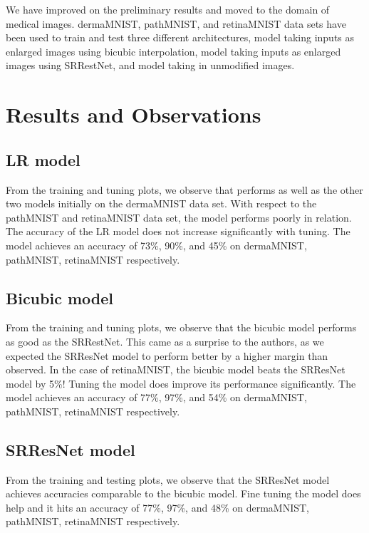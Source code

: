 \documentclass[10pt,twocolumn,letterpaper]{article}
\begin{document}
We have improved on the preliminary results and moved to the domain of medical images. dermaMNIST, pathMNIST, and retinaMNIST data sets have been used to train and test three different architectures, model taking inputs as enlarged images using bicubic interpolation, model taking inputs as enlarged images using SRRestNet, and model taking in unmodified images.

\section{Results and Observations}

\subsection{LR model}
From the training and tuning plots, we observe that performs as well as the other two models initially on the dermaMNIST data set. With respect to the pathMNIST and retinaMNIST data set, the model performs poorly in relation. The accuracy of the LR model does not increase significantly with tuning. The model achieves an accuracy of 73\%, 90\%, and 45\% on dermaMNIST, pathMNIST, retinaMNIST respectively.

\subsection{Bicubic model}
From the training and tuning plots, we observe that the bicubic model performs as good as the SRRestNet. This came as a surprise to the authors, as we expected the SRResNet model to perform better by a higher margin than observed. In the case of retinaMNIST, the bicubic model beats the SRResNet model by 5\%! Tuning the model does improve its performance significantly. The model achieves an accuracy of 77\%, 97\%, and 54\% on dermaMNIST, pathMNIST, retinaMNIST respectively.

\subsection{SRResNet model}
From the training and testing plots, we observe that the SRResNet model achieves accuracies comparable to the bicubic model. Fine tuning the model does help and it hits an accuracy of 77\%, 97\%, and 48\% on dermaMNIST, pathMNIST, retinaMNIST respectively.
\end{document}

